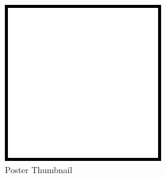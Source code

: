 \documentclass[10pt,preprint,abstract]{sensys-proc}
\begin{document}
\begin{abstract}

\end{abstract}






%


{%
\raggedright


}

\clearpage
\begin{figure}
  \centering
  \includegraphics[width=\linewidth]{placeholder}
  \caption{Poster Thumbnail}
  \label{fig:poster-thumbnail}
\end{figure}
\end{document}
